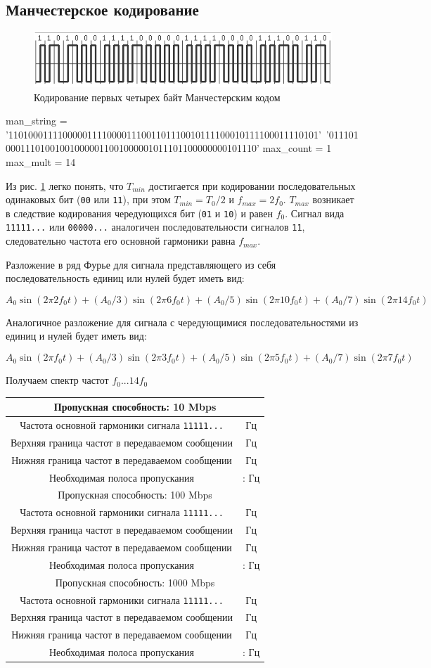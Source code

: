 \documentclass[12pt, a4paper]{article}
\newcommand{\bandwidthEntry}[2]{
  \hline
  \multicolumn{2}{|c|}{Пропускная способность: #1 Mbps} \\
  \hline
  Частота основной гармоники сигнала \texttt{11111...} & \py{int(f_0[#1] * #2)} Гц \\
  Верхняя граница частот в передаваемом сообщении & \py{int(max_mult * f_0[#1])} Гц \\
  Нижняя граница частот в передаваемом сообщении & \py{int(f_0[#1] / max_count)} Гц \\
  Необходимая полоса пропускания & \py{int(f_0[#1] / max_count)} : \py{int(max_mult * f_0[#1])} Гц \\
}
\begin{document}
\subsection{Манчестерское кодирование}

\begin{figure}[h]
  \begin{center}
    \includegraphics{manchester}
    \caption{Кодирование первых четырех байт Манчестерским кодом}
    \label{fig:man}
  \end{center}
\end{figure}

\begin{pycode}
man_string = '110100011110000011110000111001101110010111100010111100011110101'\
  '011101000111010010010000011001000001011101100000000101110'
max_count = 1
max_mult = 14
\end{pycode}

Из рис. \ref{fig:man} легко понять, что $T_{min}$ достигается при кодировании последовательных
одинаковых бит (\texttt{00} или \texttt{11}), при этом $T_{min} = T_0 / 2$ 
и $f_{max} = 2 f_0$. $T_{max}$ возникает в следствие кодирования чередующихся
бит (\texttt{01} и \texttt{10}) и равен $f_0$. Сигнал вида \texttt{11111...} или
\texttt{00000...} аналогичен последовательности сигналов \texttt{11}, следовательно
частота его основной гармоники равна $f_{max}$.

Разложение в ряд Фурье для сигнала представляющего из себя последовательность
единиц или нулей будет иметь вид:

$$A_0 \sin(2 \pi 2 f_0 t) + (A_0 / 3) \sin(2 \pi 6 f_0 t) +
  (A_0 / 5) \sin(2 \pi 10 f_0 t) + (A_0 / 7) \sin(2 \pi 14 f_0 t)$$

Аналогичное разложение для сигнала с чередующимися последовательностями из
единиц и нулей будет иметь вид:

$$A_0 \sin(2 \pi f_0 t) + (A_0 / 3) \sin(2 \pi 3 f_0 t) +
  (A_0 / 5) \sin(2 \pi 5 f_0 t) + (A_0 / 7) \sin(2 \pi 7 f_0 t)$$

Получаем спектр частот $f_0 ... 14 f_0$

\begin{tabular}{| c | c |}
  \bandwidthEntry{10}{2}
  \bandwidthEntry{100}{2}
  \bandwidthEntry{1000}{2}
  \hline
\end{tabular}
\end{document}
